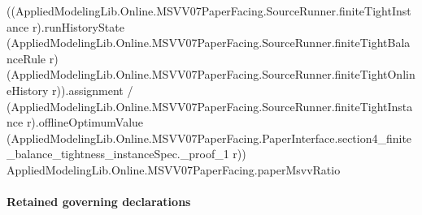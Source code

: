 \documentclass[10pt]{article}
\begin{document}
\begin{ReviewVerbatim}
                    ((AppliedModelingLib.Online.MSVV07PaperFacing.SourceRunner.finiteTightInstance r).runHistoryState
                        (AppliedModelingLib.Online.MSVV07PaperFacing.SourceRunner.finiteTightBalanceRule r)
                        (AppliedModelingLib.Online.MSVV07PaperFacing.SourceRunner.finiteTightOnlineHistory
                          r)).assignment /
                  (AppliedModelingLib.Online.MSVV07PaperFacing.SourceRunner.finiteTightInstance r).offlineOptimumValue
                    (AppliedModelingLib.Online.MSVV07PaperFacing.PaperInterface.section4_finite_balance_tightness_instanceSpec._proof_1
                      r))
              AppliedModelingLib.Online.MSVV07PaperFacing.paperMsvvRatio
\end{ReviewVerbatim}

\paragraph{Retained governing declarations}
\end{document}
